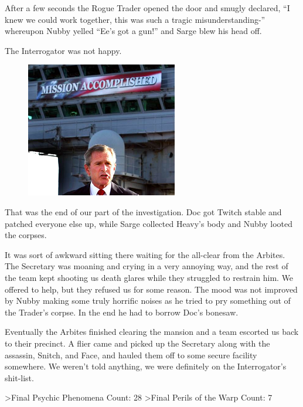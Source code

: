 After a few seconds the Rogue Trader opened the door and smugly declared, “I knew we could work together, this was such a tragic misunderstanding-” whereupon Nubby yelled “Ee’s got a gun!” and Sarge blew his head off. 

The Interrogator was not happy.

\begin{figure}
\begin{center}
	\includegraphics[width=\figwidth]{pics/3/27.png}
\end{center}
\end{figure}
That was the end of our part of the investigation. 
Doc got Twitch stable and patched everyone else up, while Sarge collected Heavy’s body and Nubby looted the corpses.

It was sort of awkward sitting there waiting for the all-clear from the Arbites. 
The Secretary was moaning and crying in a very annoying way, and the rest of the team kept shooting us death glares while they struggled to restrain him.
We offered to help, but they refused us for some reason. 
The mood was not improved by Nubby making some truly horrific noises as he tried to pry something out of the Trader’s corpse. 
In the end he had to borrow Doc’s bonesaw.

Eventually the Arbites finished clearing the mansion and a team escorted us back to their precinct. 
A flier came and picked up the Secretary along with the assassin, Snitch, and Face, and hauled them off to some secure facility somewhere. 
We weren’t told anything, we were definitely on the Interrogator’s shit-list.

>Final Psychic Phenomena Count: 28
>Final Perils of the Warp Count: 7

